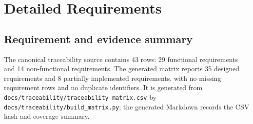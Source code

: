 \chapter{Detailed Requirements}

\section{Requirement and evidence summary}

The canonical traceability source contains 43 rows: 29 functional requirements
and 14 non-functional requirements. The generated matrix reports 35 designed
requirements and 8 partially implemented requirements, with no missing
requirement rows and no duplicate identifiers. It is generated from
\texttt{docs/traceability/traceability\_matrix.csv} by
\texttt{docs/traceability/build\_matrix.py}; the generated Markdown records the
CSV hash and coverage summary.

